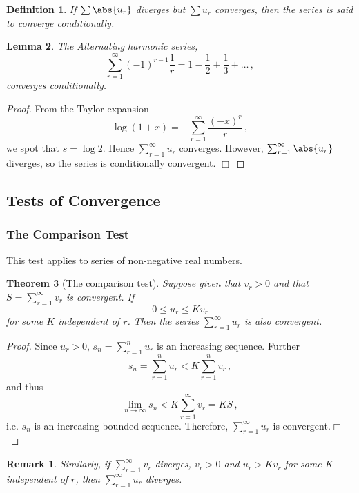 \documentclass{article}
\theoremstyle{plain}\theoremheaderfont{\normalfont\itshape}\theorembodyfont{\rmfamily}\theoremseparator{.}\newtheorem*{rem}{Remark}\newtheorem*{ex}{Example}\newtheorem*{proof}{Proof}\newtheorem*{altp}{Alternative proof}
\theoremstyle{plain}\theoremheaderfont{\normalfont\bfseries}\theorembodyfont{\rmfamily}\theoremseparator{.}\newtheorem{thm}{Theorem}[section]\newtheorem{lem}[thm]{Lemma}\newtheorem{prop}[thm]{Proposition}\newtheorem*{cor}{Corollary}\newtheorem{defn}[thm]{Definition}\newtheorem{clm}[thm]{Claim}\newtheorem{clminproof}{Claim}
\theoremstyle{break}\theoremheaderfont{\normalfont\itshape}\theorembodyfont{\rmfamily}\theoremseparator{.\medskip}\newtheorem*{proofskip}{Proof}\newtheorem*{exs}{Examples}\newtheorem*{rems}{Remarks}
\theoremstyle{break}\theoremheaderfont{\normalfont\bfseries}\theorembodyfont{\rmfamily}\theoremseparator{.\medskip}\newtheorem{lemskip}[thm]{Lemma}\newtheorem{defnskip}[thm]{Definition}\newtheorem{propskip}[thm]{Proposition}\newtheorem{thmskip}[thm]{Theorem}
\numberwithin{equation}{section}
\newcommand{\qed}{\hfill\ensuremath{\Box}}
\begin{document}
	\begin{defn}
		If \(\sum\abs{u_r}\) diverges but \(\sum u_r\) converges, then the series is said to \textit{converge conditionally}.
	\end{defn}
	\begin{lem}
		The \textit{Alternating harmonic series},
		\[\sum_{r=1}^{\infty}(-1)^{r-1}\frac{1}{r}=1-\frac{1}{2}+\frac{1}{3}+\dots\,,\]
		converges conditionally.
	\end{lem}
	\begin{proof}
		From the Taylor expansion
		\[\log(1+x)=-\sum_{r=1}^{\infty}\frac{(-x)^r}{r}\,,\]
		we spot that \(s=\log 2\). Hence \(\sum_{r=1}^{\infty}u_r\) converges. However, \(\sum_{r=1}^{\infty}\abs{u_r}\) diverges, so the series is conditionally convergent. \qed
	\end{proof}
	\subsection{Tests of Convergence}
	\subsubsection{The Comparison Test}
	This test applies to series of non-negative real numbers.
	\begin{thm}[The comparison test]		
		Suppose given that \(v_r>0\) and that \(S=\sum_{r=1}^{\infty}v_r\) is convergent. If
		\[0\le u_r\le Kv_r\]
		for some \(K\) independent of \(r\). Then the series \(\sum_{r=1}^{\infty}u_r\) is also convergent.
	\end{thm}
	\begin{proof}
		Since \(u_r>0\), \(s_n=\sum_{r=1}^{n}u_r\) is an increasing sequence. Further
		\[s_n=\sum_{r=1}^{n}u_r<K\sum_{r=1}^{n}v_r\,,\]
		and thus
		\[\lim_{n\to\infty}s_n<K\sum_{r=1}^{\infty}v_r=KS\,,\]
		i.e. \(s_n\) is an increasing bounded sequence. Therefore, \(\sum_{r=1}^{\infty}u_r\) is convergent.\qed
	\end{proof}
	\begin{rem}
		Similarly, if \(\sum_{r=1}^{\infty}v_r\) diverges, \(v_r>0\) and \(u_r>Kv_r\) for some \(K\) independent of \(r\), then \(\sum_{r=1}^{\infty}u_r\) diverges.
	\end{rem}
\end{document}
